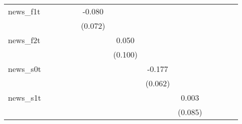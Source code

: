 {\begin{tabular}{l*{12}{c}}
\addlinespace
news\_f1t    &                     &                     &                     &                     &      -0.080         &                     &                     &                     &                     &                     &                     &                     \\
            &                     &                     &                     &                     &     (0.072)         &                     &                     &                     &                     &                     &                     &                     \\
\addlinespace
news\_f2t    &                     &                     &                     &                     &                     &       0.050         &                     &                     &                     &                     &                     &                     \\
            &                     &                     &                     &                     &                     &     (0.100)         &                     &                     &                     &                     &                     &                     \\
\addlinespace
news\_s0t    &                     &                     &                     &                     &                     &                     &      -0.177\sym{***}&                     &                     &                     &                     &                     \\
            &                     &                     &                     &                     &                     &                     &     (0.062)         &                     &                     &                     &                     &                     \\
\addlinespace
news\_s1t    &                     &                     &                     &                     &                     &                     &                     &       0.003         &                     &                     &                     &                     \\
            &                     &                     &                     &                     &                     &                     &                     &     (0.085)         &                     &                     &                     &                     \\

\end{tabular}}
